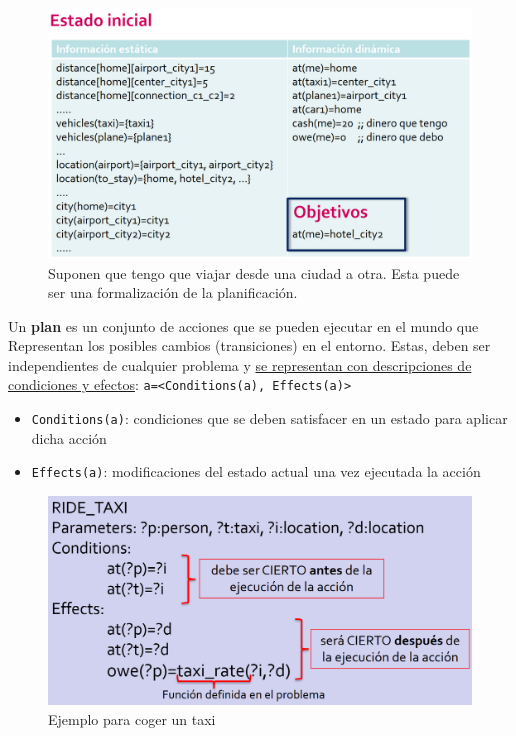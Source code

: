 \newpage

\begin{figure}[htbp]
   \centering
   \includegraphics{images/02/estadoinicial.png}
   \caption{Suponen que tengo que viajar desde una ciudad a otra. Esta puede ser una formalización de la planificación.}
   \label{fig:02/estadoinicial}
\end{figure}


\begin{paracol}{2}
   
   Un \textbf{plan} es un conjunto de acciones que se pueden ejecutar en el mundo que Representan los posibles cambios (transiciones) en el entorno. Estas, deben ser independientes de cualquier problema y \ul{se representan con descripciones de condiciones y efectos}:
   \lstinline|a=<Conditions(a), Effects(a)>|
   \begin{itemize}
      \item \lstinline|Conditions(a)|: condiciones que se deben satisfacer en un
      estado para aplicar dicha acción
      \item \lstinline|Effects(a)|: modificaciones del estado actual una vez
      ejecutada la acción
   \end{itemize}

   \switchcolumn

   \begin{figure}[htbp]
      \centering
      \includegraphics[width=\columnwidth]{images/02/condiciones.png}
      \caption{Ejemplo para coger un taxi}
      \label{fig:02/condiciones}
   \end{figure}
\end{paracol}


